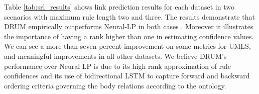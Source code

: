 \documentclass{article}
\begin{document}
\begin{table}[h!]
    \centering
    \caption{Experiment results with maximum rule length 2 and 3}\label{tab:srl_results}
\end{table}

Table \ref{tab:srl_results} shows link prediction results for each dataset in two scenarios with maximum rule length two and three. The results demonstrate that DRUM empirically outperforms Neural-LP in both cases . Moreover it illustrates the importance of having a rank higher than one in estimating confidence values. We can see a more than seven percent improvement on some metrics for UMLS, and meaningful improvements in all other datasets. We believe DRUM's performance over Neural LP is due to its high rank approximation of rule confidences and its use of bidirectional LSTM to capture forward and backward ordering criteria governing the body relations according to the ontology.
\end{document}
